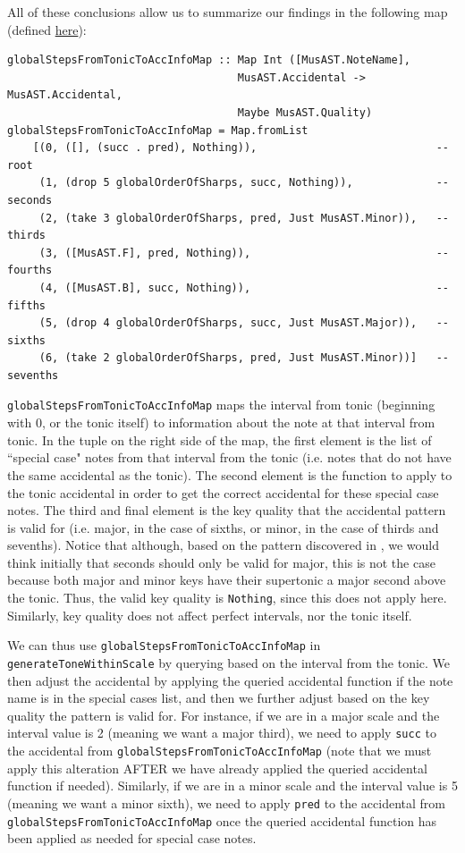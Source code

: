 \documentclass{report}
\begin{document}
All of these conclusions allow us to summarize our findings in the following map (defined \href{https://github.com/ilanashapiro/MusAssist/blob/main/app/IRConversion.hs}{here}):
\begin{verbatim}
globalStepsFromTonicToAccInfoMap :: Map Int ([MusAST.NoteName],
                                    MusAST.Accidental -> MusAST.Accidental, 
                                    Maybe MusAST.Quality)
globalStepsFromTonicToAccInfoMap = Map.fromList
    [(0, ([], (succ . pred), Nothing)),                            -- root
     (1, (drop 5 globalOrderOfSharps, succ, Nothing)),             -- seconds
     (2, (take 3 globalOrderOfSharps, pred, Just MusAST.Minor)),   -- thirds
     (3, ([MusAST.F], pred, Nothing)),                             -- fourths
     (4, ([MusAST.B], succ, Nothing)),                             -- fifths
     (5, (drop 4 globalOrderOfSharps, succ, Just MusAST.Major)),   -- sixths
     (6, (take 2 globalOrderOfSharps, pred, Just MusAST.Minor))]   -- sevenths
\end{verbatim}

\verb.globalStepsFromTonicToAccInfoMap. maps the interval from tonic (beginning with 0, or the tonic itself) to information about the note at that interval from tonic. In the tuple on the right side of the map, the first element is the list of ``special case" notes from that interval from the tonic (i.e. notes that do not have the same accidental as the tonic). The second element is the function to apply to the tonic accidental in order to get  the correct accidental for these special case notes. The third and final element is the key quality that the accidental pattern is valid for (i.e. major, in the case of sixths, or minor, in the case of thirds and sevenths). Notice that although, based on the pattern discovered in , we would think initially that seconds should only be valid for major, this is not the case because both major and minor keys have their supertonic a major second above the tonic. Thus, the valid key quality is \verb.Nothing., since this does not apply here. Similarly, key quality does not affect perfect intervals, nor the tonic itself.

We can thus use \verb.globalStepsFromTonicToAccInfoMap. in \verb.generateToneWithinScale. by querying based on the interval from the tonic. We then adjust the accidental by applying the queried accidental function if the note name is in the special cases list, and then we further adjust based on the key quality the pattern is valid for. For instance, if we are in a major scale and the interval value is 2 (meaning we want a major third), we need to apply \verb.succ. to the accidental from  \verb.globalStepsFromTonicToAccInfoMap. (note that we must apply this alteration AFTER we have already applied the queried accidental function if needed). Similarly, if we are in a minor scale and the interval value is 5 (meaning we want a minor sixth), we need to apply \verb.pred. to the accidental from  \verb.globalStepsFromTonicToAccInfoMap. once the queried accidental function has been applied as needed for special case notes.
\end{document}
